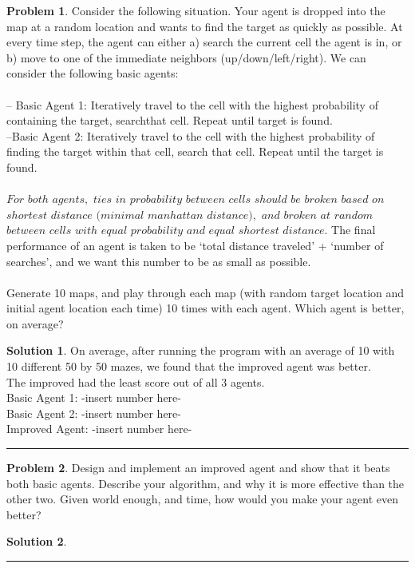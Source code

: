 \documentclass{article}
\theoremstyle{definition}
\newtheorem{problem}{Problem}
\def\fline{\rule{0.75\linewidth}{0.5pt}}
\newcommand{\finishline}{\vspace{-15pt}\begin{center}\fline\end{center}}
\newtheorem*{solution*}{Solution}
\newenvironment{solution}{\begin{solution*}}{{\finishline} \end{solution*}}
\begin{document}
\begin{problem}
Consider the following situation.  Your agent is dropped into the map at a random location and wants to find the target as quickly as possible.  At every time step, the agent can either a) search the current cell the agent is in, or b) move to one of the immediate neighbors (up/down/left/right).  We can consider the following basic agents:
\\\\
 – Basic Agent 1:  Iteratively travel to the cell with the highest probability of containing the target, searchthat cell.  Repeat until target is found.
 \\
 –Basic Agent 2:  Iteratively travel to the cell with the highest probability of finding the target within that cell, search that cell.  Repeat until the target is found.
 \\\\
 $For$ $both$ $agents,$ $ties$ $in$ $probability$ $between$ $cells$ $should$ $be$ $broken$ $based$ $on$ $shortest$ $distance$ $(minimal$ $manhattan$ $distance),$  $and$  $broken$  $at$  $random$  $between$  $cells$  $with$  $equal$  $probability$  $and$  $equal$  $shortest$  $distance.$
 The  final performance  of  an  agent  is  taken  to  be  ‘total  distance  traveled’  +  ‘number  of  searches’,  and  we  want  this number to be as small as possible.
 \\\\
 Generate 10 maps, and play through each map (with random target location and initial agent location each time) 10 times with each agent.  Which agent is better, on average?
\end{problem}
\smallskip
\begin{solution}
On average, after running the program with an average of 10 with 10 different 50 by 50 mazes, we found that the improved agent was better. \\
The improved had the least score out of all 3 agents. \\
Basic Agent 1: -insert number here-\\
Basic Agent 2: -insert number here-\\
Improved Agent: -insert number here-\\
\end{solution}

\smallskip

\begin{problem}
Design and implement an improved agent and show that it beats both basic agents.  Describe your algorithm, and why it is more effective than the other two.  Given world enough, and time, how would you make your agent even better?
\end{problem}
\smallskip
\begin{solution}
\end{solution}
\end{document}
